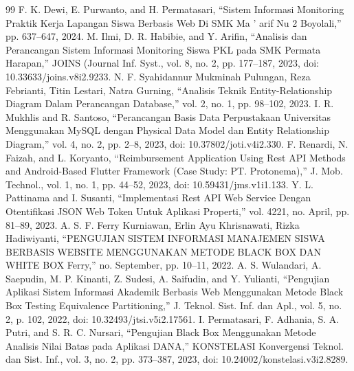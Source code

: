 \begin{thebibliography}{99}
 F. K. Dewi, E. Purwanto, and H. Permatasari, “Sistem Informasi Monitoring Praktik Kerja Lapangan Siswa Berbasis Web Di SMK Ma ’ arif Nu 2 Boyolali,” pp. 637–647, 2024.
 M. Ilmi, D. R. Habibie, and Y. Arifin, “Analisis dan Perancangan Sistem Informasi Monitoring Siswa PKL pada SMK Permata Harapan,” JOINS (Journal Inf. Syst., vol. 8, no. 2, pp. 177–187, 2023, doi: 10.33633/joins.v8i2.9233.
 N. F. Syahidannur Mukminah Pulungan, Reza Febrianti, Titin Lestari, Natra Gurning, “Analisis Teknik Entity-Relationship Diagram Dalam Perancangan Database,” vol. 2, no. 1, pp. 98–102, 2023.
 I. R. Mukhlis and R. Santoso, “Perancangan Basis Data Perpustakaan Universitas Menggunakan MySQL dengan Physical Data Model dan Entity Relationship Diagram,” vol. 4, no. 2, pp. 2–8, 2023, doi: 10.37802/joti.v4i2.330.
 F. Renardi, N. Faizah, and L. Koryanto, “Reimbursement Application Using Rest API Methods and Android-Based Flutter Framework (Case Study: PT. Protonema),” J. Mob. Technol., vol. 1, no. 1, pp. 44–52, 2023, doi: 10.59431/jms.v1i1.133.
 Y. L. Pattinama and I. Susanti, “Implementasi Rest API Web Service Dengan Otentifikasi JSON Web Token Untuk Aplikasi Properti,” vol. 4221, no. April, pp. 81–89, 2023.
 A. S. F. Ferry Kurniawan, Erlin Ayu Khrisnawati, Rizka Hadiwiyanti, “PENGUJIAN SISTEM INFORMASI MANAJEMEN SISWA BERBASIS WEBSITE MENGGUNAKAN METODE BLACK BOX DAN WHITE BOX Ferry,” no. September, pp. 10–11, 2022.
 A. S. Wulandari, A. Saepudin, M. P. Kinanti, Z. Sudesi, A. Saifudin, and Y. Yulianti, “Pengujian Aplikasi Sistem Informasi Akademik Berbasis Web Menggunakan Metode Black Box Testing Equivalence Partitioning,” J. Teknol. Sist. Inf. dan Apl., vol. 5, no. 2, p. 102, 2022, doi: 10.32493/jtsi.v5i2.17561.
 I. Permatasari, F. Adhania, S. A. Putri, and S. R. C. Nursari, “Pengujian Black Box Menggunakan Metode Analisis Nilai Batas pada Aplikasi DANA,” KONSTELASI Konvergensi Teknol. dan Sist. Inf., vol. 3, no. 2, pp. 373–387, 2023, doi: 10.24002/konstelasi.v3i2.8289.
\end{thebibliography}
